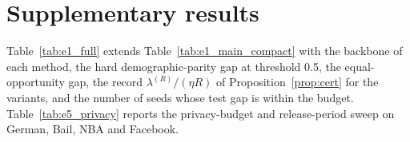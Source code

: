 \section{Supplementary results}\label{app:supp}

Table~\ref{tab:e1_full} extends Table~\ref{tab:e1_main_compact} with the backbone of each method, the hard demographic-parity gap at threshold 0.5, the equal-opportunity gap, the record $\lambda^{(R)}/(\eta R)$ of Proposition~\ref{prop:cert} for the \clamp{} variants, and the number of seeds whose test gap is within the budget. Table~\ref{tab:e5_privacy} reports the privacy-budget and release-period sweep on German, Bail, NBA and Facebook.






